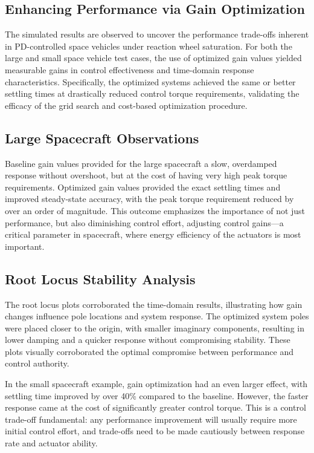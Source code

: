 \documentclass{ifacconf}
\begin{document}
\subsection{Enhancing Performance via Gain Optimization}

The simulated results are observed to uncover the performance trade-offs inherent in PD-controlled space vehicles under reaction wheel saturation. For both the large and small space vehicle test cases, the use of optimized gain values yielded measurable gains in control effectiveness and time-domain response characteristics. Specifically, the optimized systems achieved the same or better settling times at drastically reduced control torque requirements, validating the efficacy of the grid search and cost-based optimization procedure.

\subsection{Large Spacecraft Observations}

Baseline gain values provided for the large spacecraft a slow, overdamped response without overshoot, but at the cost of having very high peak torque requirements. Optimized gain values provided the exact settling times and improved steady-state accuracy, with the peak torque requirement reduced by over an order of magnitude. This outcome emphasizes the importance of not just performance, but also diminishing control effort, adjusting control gains—a critical parameter in spacecraft, where energy efficiency of the actuators is most important. 

\subsection{Root Locus Stability Analysis}

The root locus plots corroborated the time-domain results, illustrating how gain changes influence pole locations and system response. The optimized system poles were placed closer to the origin, with smaller imaginary components, resulting in lower damping and a quicker response without compromising stability. These plots visually corroborated the optimal compromise between performance and control authority.

In the small spacecraft example, gain optimization had an even larger effect, with settling time improved by over 40\% compared to the baseline. However, the faster response came at the cost of significantly greater control torque. This is a control trade-off fundamental: any performance improvement will usually require more initial control effort, and trade-offs need to be made cautiously between response rate and actuator ability.
\end{document}
